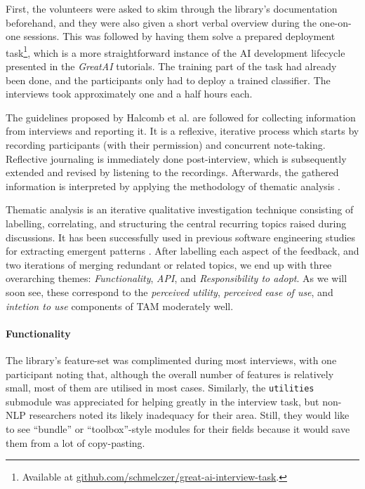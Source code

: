 First, the volunteers were asked to skim through the library's documentation beforehand, and they were also given a short verbal overview during the one-on-one sessions. This was followed by having them solve a prepared deployment task\footnote{Available at \href{https://github.com/schmelczer/great-ai-interview-task}{github.com/schmelczer/great-ai-interview-task}.}, which is a more straightforward instance of the AI development lifecycle presented in the \textit{GreatAI} tutorials. The training part of the task had already been done, and the participants only had to deploy a trained classifier. The interviews took approximately one and a half hours each.

The guidelines proposed by Halcomb et al. \cite{halcomb2006verbatim} are followed for collecting information from interviews and reporting it. It is a reflexive, iterative process which starts by recording participants (with their permission) and concurrent note-taking. Reflective journaling is immediately done post-interview, which is subsequently extended and revised by listening to the recordings. Afterwards, the gathered information is interpreted by applying the methodology of thematic analysis \cite{alhojailan2012thematic}.

Thematic analysis is an iterative qualitative investigation technique consisting of labelling, correlating, and structuring the central recurring topics raised during discussions. It has been successfully used in previous software engineering studies for extracting emergent patterns \cite{haakman2021ai,cruz2019catalog}. After labelling each aspect of the feedback, and two iterations of merging redundant or related topics, we end up with three overarching themes: \textit{Functionality}, \textit{API}, and \textit{Responsibility to adopt}. As we will soon see, these correspond to the \textit{perceived utility}, \textit{perceived ease of use}, and \textit{intetion to use} components of TAM moderately well.

\paragraph{Functionality} The library's feature-set was complimented during most interviews, with one participant noting that, although the overall number of features is relatively small, most of them are utilised in most cases. Similarly, the \texttt{utilities} submodule was appreciated for helping greatly in the interview task, but non-NLP researchers noted its likely inadequacy for their area. Still, they would like to see ``bundle'' or ``toolbox''-style modules for their fields because it would save them from a lot of copy-pasting.

